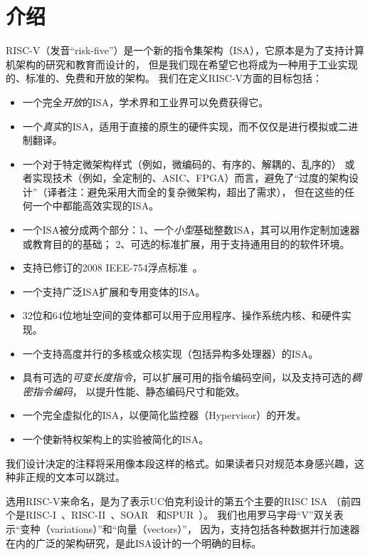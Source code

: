 \chapter{介绍}
RISC-V（发音“risk-five”）是一个新的指令集架构（ISA），它原本是为了支持计算机架构的研究和教育而设计的，
但是我们现在希望它也将成为一种用于工业实现的、标准的、免费和开放的架构。
我们在定义RISC-V方面的目标包括：

\vspace{-0.1in}
\begin{itemize}
\parskip 0pt
\itemsep 1pt
\item 一个完全{\em 开放}的ISA，学术界和工业界可以免费获得它。

\item 一个{\em 真实}的ISA，适用于直接的原生的硬件实现，而不仅仅是进行模拟或二进制翻译。

\item 一个对于特定微架构样式（例如，微编码的、有序的、解耦的、乱序的）
  或者实现技术（例如，全定制的、ASIC、FPGA）而言，避免了“过度的架构设计”（译者注：避免采用大而全的复杂微架构，超出了需求），
  但在这些的任何一个中都能高效实现的ISA。

\item 一个ISA被分成两个部分：1、一个{\em 小型}基础整数ISA，其可以用作定制加速器或教育目的的基础；
  2、可选的标准扩展，用于支持通用目的的软件环境。

\item 支持已修订的2008 IEEE-754浮点标准~\cite{ieee754-2008}。

\item 一个支持广泛ISA扩展和专用变体的ISA。

\item 32位和64位地址空间的变体都可以用于应用程序、操作系统内核、和硬件实现。

\item 一个支持高度并行的多核或众核实现（包括异构多处理器）的ISA。

\item 具有可选的{\em 可变长度指令}，可以扩展可用的指令编码空间，以及支持可选的{\em 稠密指令编码}，
以提升性能、静态编码尺寸和能效。

\item 一个完全虚拟化的ISA，以便简化监控器（Hypervisor）的开发。

\item 一个使新特权架构上的实验被简化的ISA。
\end{itemize}
\vspace{-0.1in}

\begin{commentary}
  我们设计决定的注释将采用像本段这样的格式。如果读者只对规范本身感兴趣，这种非正规的文本可以跳过。
\end{commentary}
\begin{commentary}
  选用RISC-V来命名，是为了表示UC伯克利设计的第五个主要的RISC ISA
  （前四个是RISC-I~\cite{riscI-isca1981}、RISC-II~\cite{Katevenis:1983}、SOAR~\cite{Ungar:1984}
  和SPUR~\cite{spur-jsscc1989}）。
  我们也用罗马字母“V”双关表示“变种（variations）”和“向量（vectors）”，
  因为，支持包括各种数据并行加速器在内的广泛的架构研究，是此ISA设计的一个明确的目标。
\end{commentary}


